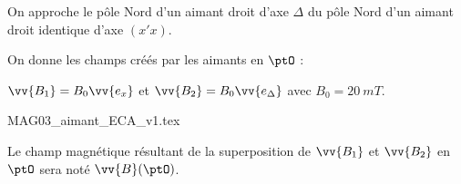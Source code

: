 \hauteurLargeurCadreReponse		{8mm}{4cm}
\initialisationEntrainement


\debutEntrainement

                                \initialisationPartieGauche %
On approche le pôle Nord d'un aimant droit d'axe $\Delta$ du pôle Nord d'un aimant droit identique d'axe $(x'x)$.

On donne les champs créés par les aimants en $\ptO$ :

$\vv{B_1} = B_0 \vv{e_x}$ et $\vv{B_2} = B_0 \vv{e_\Delta}$ avec $B_0 = \SI{20}{mT}$. 
%
%
                                \initialisationPartieDroite %
\begin{center}
{MAG03_aimant_ECA_v1.tex}
\end{center}
%
                               \finalisationDuPartageDePage %

Le champ magnétique résultant de la superposition de $\vv{B_1}$ et $\vv{B_2} $ en $\ptO$ sera noté $\vv{B}(\ptO)$.

